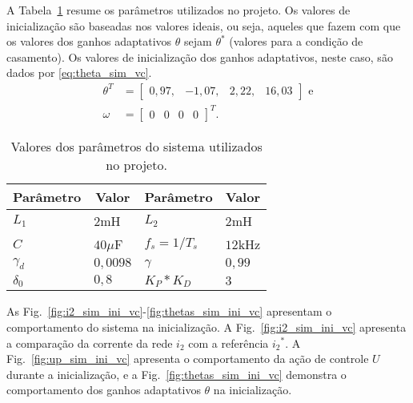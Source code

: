   A Tabela~\ref{tab:parametros_projeto_vc} resume os parâmetros utilizados no projeto. Os valores de inicialização são baseadas nos valores ideais, ou seja, aqueles que fazem com que os valores dos ganhos adaptativos $\theta$ sejam $\theta^*$ (valores para a condição de casamento). Os valores de inicialização dos ganhos adaptativos, neste caso, são dados por \ref{eq:theta_sim_vc}.
  \begin{equation}
    \begin{split}
      \theta^T & = \left[ \begin{matrix} 0,97, & -1,07, & 2,22, & 16,03 \end{matrix} \right]\text{ e}\\
      \omega & = {\left[ \begin{matrix} 0 & 0 & 0 & 0 \end{matrix} \right]}^T\text{.}
    \end{split}
    \label{eq:theta_sim_vc}
  \end{equation}

  \begin{table}[htb]
    \renewcommand{\arraystretch}{1.35}
    \setlength{\tabcolsep}{1.2mm}
    \caption{Valores dos parâmetros do sistema utilizados no projeto.}
    \label{tab:parametros_projeto_vc}
    \centering
    \begin{tabular}{l l l l}
      \hline
      \multicolumn{1}{c}{Parâmetro} & \multicolumn{1}{c}{Valor} &
      \multicolumn{1}{c}{Parâmetro} & \multicolumn{1}{c}{Valor} \\
      \hline
      $L_1$      & $2$mH    & $L_2$         & $2$mH   \\
      $C$        & $40\mu$F & $f_s = 1/T_s$ & $12$kHz \\
      $\gamma_d$ & $0,0098$ & $\gamma$      & $0,99$  \\
      $\delta_0$ & $0,8$    & $K_P*K_D$     & $3$     \\
      \hline
    \end{tabular}
  \end{table}

  As Fig.~\ref{fig:i2_sim_ini_vc}-\ref{fig:thetas_sim_ini_vc} apresentam o comportamento do sistema na inicialização. A Fig.~\ref{fig:i2_sim_ini_vc} apresenta a comparação da corrente da rede $i_2$ com a referência ${i_2}^*$. A Fig.~\ref{fig:up_sim_ini_vc} apresenta o comportamento da ação de controle $U$ durante a inicialização, e a Fig.~\ref{fig:thetas_sim_ini_vc} demonstra o comportamento dos ganhos adaptativos $\theta$ na inicialização.

